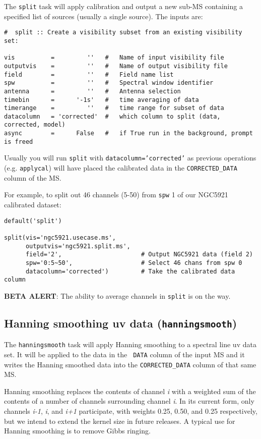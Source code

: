 The {\tt split} task will apply calibration and output a new sub-MS
containing a specified list of sources (usually a single source).
The inputs are:
\small
\begin{verbatim}
#  split :: Create a visibility subset from an existing visibility set:

vis          =         ''   #   Name of input visibility file
outputvis    =         ''   #   Name of output visibility file
field        =         ''   #   Field name list
spw          =         ''   #   Spectral window identifier
antenna      =         ''   #   Antenna selection
timebin      =      '-1s'   #   time averaging of data
timerange    =         ''   #   time range for subset of data
datacolumn   = 'corrected'  #   which column to split (data, corrected, model)
async        =      False   #   if True run in the background, prompt is freed
\end{verbatim}
\normalsize
Usually you will run {\tt split} with {\tt datacolumn='corrected'} as
previous operations (e.g. {\tt applycal}) will have placed the
calibrated data in the {\tt CORRECTED\_DATA} column of the MS.

For example, to split out 46 channels (5-50) from {\tt spw} 1 of
our NGC5921 calibrated dataset:
\small
\begin{verbatim}
default('split')

split(vis='ngc5921.usecase.ms',       
      outputvis='ngc5921.split.ms',    
      field='2',                      # Output NGC5921 data (field 2)
      spw='0:5~50',                   # Select 46 chans from spw 0
      datacolumn='corrected')         # Take the calibrated data column
\end{verbatim}
\normalsize

{\bf BETA ALERT}: The ability to average channels in {\tt split} is
on the way.

\subsection{Hanning smoothing uv data ({\tt hanningsmooth})}
\label{section:cal.other.hanningsmooth}

The {\tt hanningsmooth} task will apply Hanning smoothing to a
spectral line uv data set.  It will be applied to the data in the {\tt
DATA} column of the input MS and it writes the Hanning smoothed data
into the {\tt CORRECTED\_DATA} column of that same MS.

Hanning smoothing replaces the contents of channel {\it i} with a
weighted sum of the contents of a number of channels surrounding
channel {\it i}.  In its current form, only channels {\it i-1}, {\it
i}, and {\it i+1} participate, with weights 0.25, 0.50, and 0.25
respectively, but we intend to extend the kernel size in future
releases.  A typical use for Hanning smoothing is to remove Gibbs
ringing.

